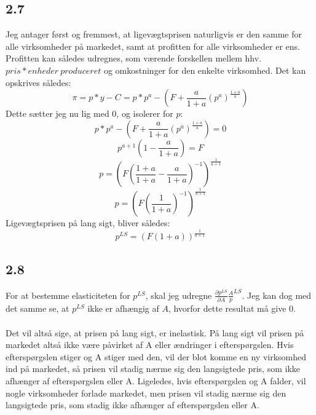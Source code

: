 \documentclass{article}
\begin{document}
\subsection*{2.7}
Jeg antager først og fremmest, at ligevægtsprisen naturligvis er den samme for alle virksomheder på markedet, samt at profitten for alle virksomheder er ens. Profitten kan således udregnes, som værende forskellen mellem hhv. $pris * enheder \ produceret$ og omkostninger for den enkelte virksomhed. Det kan opskrives således: 
\begin{equation}
    \pi=p * y-C=p * p^a-\left(F+\frac{a}{1+a}\left(p^a\right)^{\frac{1+a}{a}}\right)
\end{equation}
Dette sætter jeg nu lig med $0$, og isolerer for $p$:
\begin{equation}
    p * p^a-\left(F+\frac{a}{1+a}\left(p^a\right)^{\frac{1+a}{a}}\right) = 0
\end{equation}
\begin{equation}
    p^{a+1}\left(1-\frac{a}{1+a}\right)=F
\end{equation}
\begin{equation}
p=\left(F\left(\frac{1+a}{1+a}-\frac{a}{1+a}\right)^{-1}\right)^{\frac{1}{a+1}}
\end{equation}
\begin{equation}
    p=\left(F\left(\frac{1}{1+a}\right)^{-1}\right)^{\frac{1}{a+1}}
\end{equation}
Ligevægtsprisen på lang sigt, bliver således:
\begin{equation}
    p^{LS}=(F(1+a))^{\frac{1}{a+1}}
\end{equation}

\subsection*{2.8}
For at bestemme elasticiteten for $p^{LS}$, skal jeg udregne $\frac{\partial p^{LS}}{\partial A} \frac{A}p^{LS}$. Jeg kan dog med det samme se, at $p^{LS}$ ikke er afhængig af $A$, hvorfor dette resultat må give $0$. 
\\
\\
Det vil altså sige, at prisen på lang sigt, er inelastisk. På lang sigt vil prisen på markedet altså ikke være påvirket af A eller ændringer i efterspørgslen. Hvis efterspørgslen stiger og A stiger med den, vil der blot komme en ny virksomhed ind på markedet, så prisen vil stadig nærme sig den langsigtede pris, som ikke afhænger af efterspørgslen eller A. Ligeledes, hvis efterspørgslen og A falder, vil nogle virksomheder forlade markedet, men prisen vil stadig nærme sig den langsigtede pris, som stadig ikke afhænger af efterspørgslen eller A.
\end{document}
